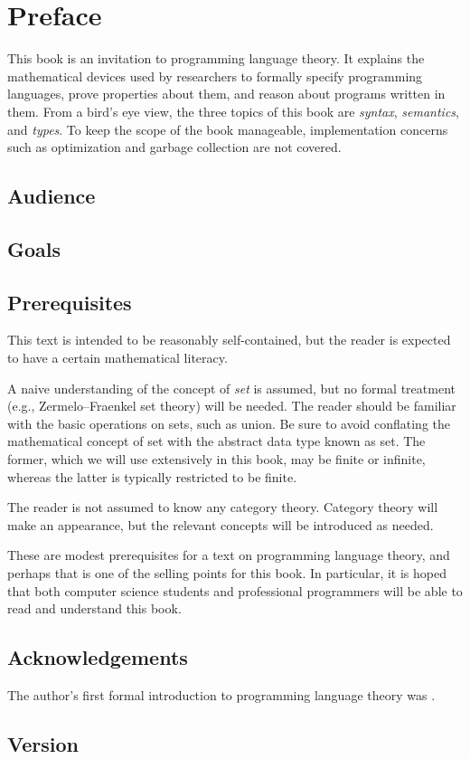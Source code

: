 \chapter{Preface}

  This book is an invitation to programming language theory. It explains the mathematical devices used by researchers to formally specify programming languages, prove properties about them, and reason about programs written in them. From a bird's eye view, the three topics of this book are \emph{syntax}, \emph{semantics}, and \emph{types}. To keep the scope of the book manageable, implementation concerns such as optimization and garbage collection are not covered.

  \section*{Audience}

  \section*{Goals}

  \section*{Prerequisites}

    This text is intended to be reasonably self-contained, but the reader is expected to have a certain mathematical literacy.

    A naive understanding of the concept of \emph{set} is assumed, but no formal treatment (e.g., Zermelo--Fraenkel set theory) will be needed. The reader should be familiar with the basic operations on sets, such as union. Be sure to avoid conflating the mathematical concept of set with the abstract data type known as set. The former, which we will use extensively in this book, may be finite or infinite, whereas the latter is typically restricted to be finite.

    The reader is not assumed to know any category theory. Category theory will make an appearance, but the relevant concepts will be introduced as needed.

    These are modest prerequisites for a text on programming language theory, and perhaps that is one of the selling points for this book. In particular, it is hoped that both computer science students and professional programmers will be able to read and understand this book.

  \section*{Acknowledgements}

    The author's first formal introduction to programming language theory was \textcite{tapl}.

  \section*{Version}

    
